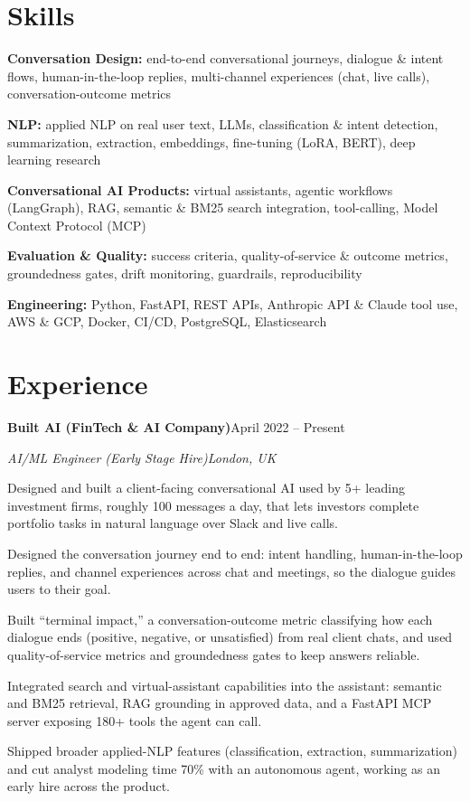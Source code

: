 \documentclass[10pt,a4paper]{article}
\newcommand{\entry}[4]{%
  {\color{company}\bfseries #1}\hfill {\color{muted}#2}\par
  \vspace{1pt}
  {\itshape #3}\hfill {\color{muted}\itshape #4}\par
  \vspace{3pt}%
}
\begin{document}
\section{Skills}
\begin{tight}
  \item[\textcolor{accent}{\small$\bullet$}] \textbf{Conversation Design:} end-to-end conversational journeys, dialogue \& intent flows, human-in-the-loop replies, multi-channel experiences (chat, live calls), conversation-outcome metrics
  \item[\textcolor{accent}{\small$\bullet$}] \textbf{NLP:} applied NLP on real user text, LLMs, classification \& intent detection, summarization, extraction, embeddings, fine-tuning (LoRA, BERT), deep learning research
  \item[\textcolor{accent}{\small$\bullet$}] \textbf{Conversational AI Products:} virtual assistants, agentic workflows (LangGraph), RAG, semantic \& BM25 search integration, tool-calling, Model Context Protocol (MCP)
  \item[\textcolor{accent}{\small$\bullet$}] \textbf{Evaluation \& Quality:} success criteria, quality-of-service \& outcome metrics, groundedness gates, drift monitoring, guardrails, reproducibility
  \item[\textcolor{accent}{\small$\bullet$}] \textbf{Engineering:} Python, FastAPI, REST APIs, Anthropic API \& Claude tool use, AWS \& GCP, Docker, CI/CD, PostgreSQL, Elasticsearch
\end{tight}

\section{Experience}
\entry{Built AI (FinTech \& AI Company)}{April 2022 -- Present}{AI/ML Engineer (Early Stage Hire)}{London, UK}
\begin{tight}
  \item Designed and built a client-facing conversational AI used by 5+ leading investment firms, roughly 100 messages a day, that lets investors complete portfolio tasks in natural language over Slack and live calls.
  \item Designed the conversation journey end to end: intent handling, human-in-the-loop replies, and channel experiences across chat and meetings, so the dialogue guides users to their goal.
  \item Built ``terminal impact,'' a conversation-outcome metric classifying how each dialogue ends (positive, negative, or unsatisfied) from real client chats, and used quality-of-service metrics and groundedness gates to keep answers reliable.
  \item Integrated search and virtual-assistant capabilities into the assistant: semantic and BM25 retrieval, RAG grounding in approved data, and a FastAPI MCP server exposing 180+ tools the agent can call.
  \item Shipped broader applied-NLP features (classification, extraction, summarization) and cut analyst modeling time 70\% with an autonomous agent, working as an early hire across the product.
\end{tight}
\end{document}

